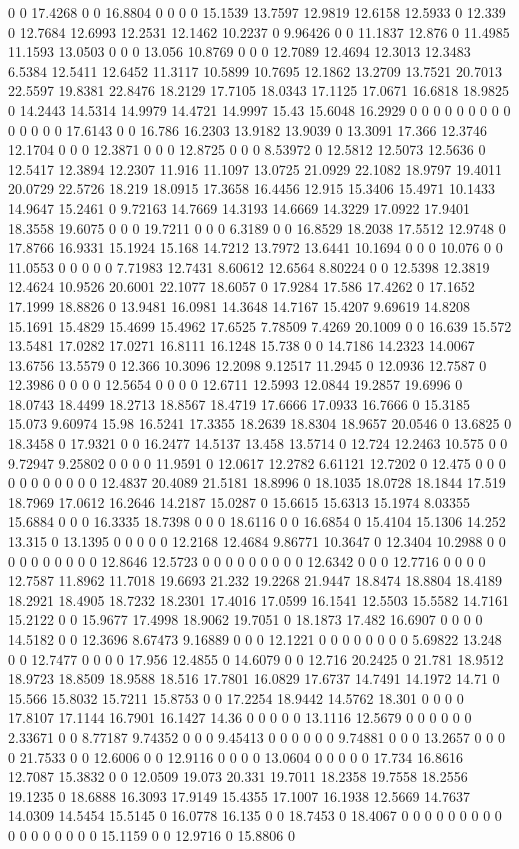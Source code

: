 0 0 17.4268 0 0 16.8804 0 0 0 0 15.1539 13.7597 12.9819 12.6158 12.5933 0 12.339 0 12.7684 12.6993 12.2531 12.1462 10.2237 0 9.96426 0 0 11.1837 12.876 0 11.4985 11.1593 13.0503 0 0 0 13.056 10.8769 0 0 0 12.7089 12.4694 12.3013 12.3483 6.5384 12.5411 12.6452 11.3117 10.5899 10.7695 12.1862 13.2709 13.7521 20.7013 22.5597 19.8381 22.8476 18.2129 17.7105 18.0343 17.1125 17.0671 16.6818 18.9825 0 14.2443 14.5314 14.9979 14.4721 14.9997 15.43 15.6048 16.2929 0 0 0 0 0 0 0 0 0 0 0 0 0 0 17.6143 0 0 16.786 16.2303 13.9182 13.9039 0 13.3091 17.366 12.3746 12.1704 0 0 0 12.3871 0 0 0 12.8725 0 0 0 8.53972 0 12.5812 12.5073 12.5636 0 12.5417 12.3894 12.2307 11.916 11.1097 13.0725 21.0929 22.1082 18.9797 19.4011 20.0729 22.5726 18.219 18.0915 17.3658 16.4456 12.915 15.3406 15.4971 10.1433 14.9647 15.2461 0 9.72163 14.7669 14.3193 14.6669 14.3229 17.0922 17.9401 18.3558 19.6075 0 0 0 19.7211 0 0 0 6.3189 0 0 16.8529 18.2038 17.5512 12.9748 0 17.8766 16.9331 15.1924 15.168 14.7212 13.7972 13.6441 10.1694 0 0 0 10.076 0 0 11.0553 0 0 0 0 0 7.71983 12.7431 8.60612 12.6564 8.80224 0 0 12.5398 12.3819 12.4624 10.9526 20.6001 22.1077 18.6057 0 17.9284 17.586 17.4262 0 17.1652 17.1999 18.8826 0 13.9481 16.0981 14.3648 14.7167 15.4207 9.69619 14.8208 15.1691 15.4829 15.4699 15.4962 17.6525 7.78509 7.4269 20.1009 0 0 16.639 15.572 13.5481 17.0282 17.0271 16.8111 16.1248 15.738 0 0 14.7186 14.2323 14.0067 13.6756 13.5579 0 12.366 10.3096 12.2098 9.12517 11.2945 0 12.0936 12.7587 0 12.3986 0 0 0 0 12.5654 0 0 0 0 12.6711 12.5993 12.0844 19.2857 19.6996 0 18.0743 18.4499 18.2713 18.8567 18.4719 17.6666 17.0933 16.7666 0 15.3185 15.073 9.60974 15.98 16.5241 17.3355 18.2639 18.8304 18.9657 20.0546 0 13.6825 0 18.3458 0 17.9321 0 0 16.2477 14.5137 13.458 13.5714 0 12.724 12.2463 10.575 0 0 9.72947 9.25802 0 0 0 0 11.9591 0 12.0617 12.2782 6.61121 12.7202 0 12.475 0 0 0 0 0 0 0 0 0 0 0 12.4837 20.4089 21.5181 18.8996 0 18.1035 18.0728 18.1844 17.519 18.7969 17.0612 16.2646 14.2187 15.0287 0 15.6615 15.6313 15.1974 8.03355 15.6884 0 0 0 16.3335 18.7398 0 0 0 18.6116 0 0 16.6854 0 15.4104 15.1306 14.252 13.315 0 13.1395 0 0 0 0 0 12.2168 12.4684 9.86771 10.3647 0 12.3404 10.2988 0 0 0 0 0 0 0 0 0 0 12.8646 12.5723 0 0 0 0 0 0 0 0 0 12.6342 0 0 0 12.7716 0 0 0 0 12.7587 11.8962 11.7018 19.6693 21.232 19.2268 21.9447 18.8474 18.8804 18.4189 18.2921 18.4905 18.7232 18.2301 17.4016 17.0599 16.1541 12.5503 15.5582 14.7161 15.2122 0 0 15.9677 17.4998 18.9062 19.7051 0 18.1873 17.482 16.6907 0 0 0 0 14.5182 0 0 12.3696 8.67473 9.16889 0 0 0 12.1221 0 0 0 0 0 0 0 0 5.69822 13.248 0 0 12.7477 0 0 0 0 17.956 12.4855 0 14.6079 0 0 12.716 20.2425 0 21.781 18.9512 18.9723 18.8509 18.9588 18.516 17.7801 16.0829 17.6737 14.7491 14.1972 14.71 0 15.566 15.8032 15.7211 15.8753 0 0 17.2254 18.9442 14.5762 18.301 0 0 0 0 17.8107 17.1144 16.7901 16.1427 14.36 0 0 0 0 0 13.1116 12.5679 0 0 0 0 0 0 2.33671 0 0 8.77187 9.74352 0 0 0 9.45413 0 0 0 0 0 0 9.74881 0 0 0 13.2657 0 0 0 0 21.7533 0 0 12.6006 0 0 12.9116 0 0 0 0 13.0604 0 0 0 0 0 17.734 16.8616 12.7087 15.3832 0 0 12.0509 19.073 20.331 19.7011 18.2358 19.7558 18.2556 19.1235 0 18.6888 16.3093 17.9149 15.4355 17.1007 16.1938 12.5669 14.7637 14.0309 14.5454 15.5145 0 16.0778 16.135 0 0 18.7453 0 18.4067 0 0 0 0 0 0 0 0 0 0 0 0 0 0 0 0 0 15.1159 0 0 12.9716 0 15.8806 0 